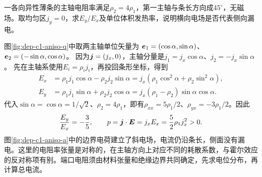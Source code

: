 \begin{example}[旋转主轴的电阻条]
一各向异性薄条的主轴电阻率满足$\rho_2=4\rho_1$，第一主轴与条长方向成$45^\circ$，无磁场。取均匀区$j_y=0$，求$E_y/E_x$及单位体积发热率，说明横向电场是否代表侧向漏电。
\end{example}
\begin{solution}
图\ref{fig:dep-c1-aniso-q}中取两主轴单位矢量为
$\bm{e}_1=(\cos\alpha,\sin\alpha)$、$\bm{e}_2=(-\sin\alpha,\cos\alpha)$。
因为$\bm{j}=(j_x,0)$，主轴分量是$j_1=j_x\cos\alpha$、$j_2=-j_x\sin\alpha$。
先在主轴系使用$E_i=\rho_i j_i$，再投回条形坐标，得到
\[
 \begin{aligned}
 E_x&=\rho_1j_1\cos\alpha-\rho_2j_2\sin\alpha
 =j_x(\rho_1\cos^2\alpha+\rho_2\sin^2\alpha),\\
 E_y&=\rho_1j_1\sin\alpha+\rho_2j_2\cos\alpha
 =j_x(\rho_1-\rho_2)\sin\alpha\cos\alpha.
 \end{aligned}
\]
代入$\sin\alpha=\cos\alpha=1/\sqrt2$、$\rho_2=4\rho_1$，即有$\rho_{xx}=5\rho_1/2$、$\rho_{yx}=-3\rho_1/2$。因此
\[
 \frac{E_y}{E_x}=-\frac35,\qquad
 p=\bm{j}\cdot\bm{E}=j_xE_x=\frac52\rho_1j_x^2>0.
\]
图\ref{fig:dep-c1-aniso-a}中的边界电荷建立了斜电场，电流仍沿条长，侧面没有漏电。这里的电阻率张量是对称的，在主轴方向上对应不同的耗散系数，与霍尔效应的反对称项有别。端口电阻须由材料张量和绝缘边界共同确定，先求电位分布，再计算总电流。
\end{solution}
